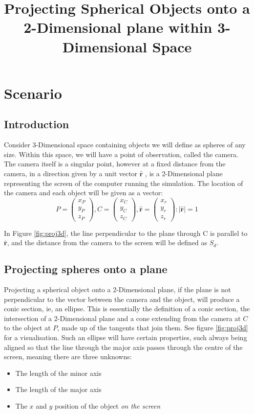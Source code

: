\documentclass{article}
\title{Projecting Spherical Objects onto a 2-Dimensional plane within 3-Dimensional Space}
\date{}
\newcommand\dd{{2-Dimensional}\xspace}
\newcommand\ddd{{3-Dimensional}\xspace}
\newcommand\ru{\hat{\mathbf{r}}\xspace}
\begin{document}
\maketitle
\tableofcontents
\section{Scenario}

	\subsection{Introduction}
	Consider \ddd space containing objects we will define as spheres of any size. Within this space, we will have a point of
	observation, called the camera. The camera itself is a singular point, however at a fixed distance from the camera, in a direction given by a
	unit vector $\ru$ , is a \dd plane
	representing the screen of the computer running the simulation. The location of the camera and each object will be given as a vector:
	$$P = \begin{pmatrix}x_P\\y_P\\z_P\end{pmatrix}, C = \begin{pmatrix}x_C\\y_C\\z_C\end{pmatrix}, \hat{\mathbf{r}} = \begin{pmatrix}x_r\\y_r\\z_r\end{pmatrix}:|\ru|=1$$


	In Figure \ref{fig:proj3d}, the line perpendicular to the plane through C is parallel to $\ru$, and the distance from the camera to the screen will be
	defined as $S_d$.
	\subsection{Projecting spheres onto a plane}
	Projecting a spherical object onto a \dd plane, if the plane is not perpendicular to the vector between the camera and the object, will produce a conic section, ie, an ellipse. This is essentially the definition of a conic section, the intersection of a \dd plane and a cone extending from the camera at $C$ to the object at $P$, made up of the tangents that join them. 
See figure \ref{fig:proj3d} for a visualisation.
Such an ellipse will have certain properties, such always being aligned so that the line through the major axis passes through the centre of the screen, meaning there are three unknowns:
	\begin{itemize}
		\item The length of the minor axis
		\item The length of the major axis
		\item The $x$ and $y$ position of the object \textit{on the screen}
	\end{itemize}
\end{document}
